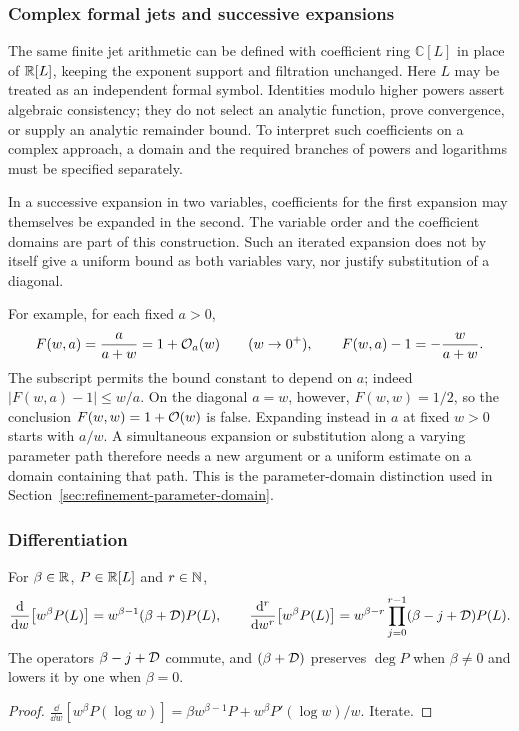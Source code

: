 \subsubsection*{Complex formal jets and successive expansions}
\label{sec:formal-successive-jets}

The same finite jet arithmetic can be defined with coefficient ring
$\mathbb C[L]$ in place of $\mathbb R[L]$, keeping the exponent support and
filtration unchanged. Here $L$ may be treated as an independent formal
symbol. Identities modulo higher powers assert algebraic consistency;
they do not select an analytic function, prove convergence, or supply an
analytic remainder bound. To interpret such coefficients on a complex
approach, a domain and the required branches of powers and logarithms
must be specified separately.

In a successive expansion in two variables, coefficients for the first
expansion may themselves be expanded in the second. The variable order
and the coefficient domains are part of this construction. Such an
iterated expansion does not by itself give a uniform bound as both
variables vary, nor justify substitution of a diagonal.

For example, for each fixed $a>0$,
\[
 F(w,a)=\frac{a}{a+w}=1+\mathcal O_a(w)\qquad(w\to0^+),
 \qquad F(w,a)-1=-\frac{w}{a+w}.
\]
The subscript permits the bound constant to depend on $a$; indeed
$|F(w,a)-1|\le w/a$. On the diagonal $a=w$, however,
$F(w,w)=1/2$, so the conclusion $F(w,w)=1+\mathcal O(w)$ is false.
Expanding instead in $a$ at fixed $w>0$ starts with $a/w$.
A simultaneous expansion or substitution along a varying parameter path
therefore needs a new argument or a uniform estimate on a domain
containing that path. This is the parameter-domain distinction used in
Section~\ref{sec:refinement-parameter-domain}.

\subsubsection*{Differentiation}

\begin{lemma}
\label{lem:euler}
For $\beta\in\mathbb R$, $P\in\mathbb R[L]$ and $r\in\mathbb N$,
\begin{equation}
 \frac{\mathrm d}{\mathrm d w}\bigl[w^\beta P(L)\bigr]=w^{\beta-1}(\beta+\mathcal D)P(L),\qquad
 \frac{\mathrm d^r}{\mathrm d w^r}\bigl[w^\beta P(L)\bigr]=w^{\beta-r}\prod_{j=0}^{r-1}(\beta-j+\mathcal D)P(L).
 \label{eq:euler}
\end{equation}
The operators $\beta-j+\mathcal D$ commute, and $(\beta+\mathcal D)$ preserves $\deg P$ when $\beta\ne0$ and lowers it by one when $\beta=0$.
\end{lemma}
\begin{proof}
$\frac{\dd}{\dd w}[w^\beta P(\log w)]=\beta w^{\beta-1}P+w^\beta P'(\log w)/w$. Iterate.
\end{proof}

